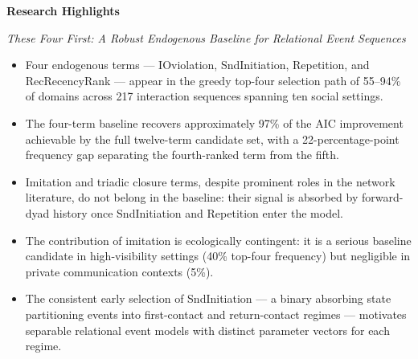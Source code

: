 \documentclass[11pt]{article}
\begin{document}
\noindent\textbf{Research Highlights}

\medskip
\noindent\textit{These Four First: A Robust Endogenous Baseline for Relational Event Sequences}

\bigskip
\begin{itemize}[leftmargin=1.5em, itemsep=0.5em]

  \item Four endogenous terms --- IOviolation, SndInitiation, Repetition, and
        RecRecencyRank --- appear in the greedy top-four selection path of 55--94\%
        of domains across 217 interaction sequences spanning ten social settings.

  \item The four-term baseline recovers approximately 97\% of the AIC improvement
        achievable by the full twelve-term candidate set, with a 22-percentage-point
        frequency gap separating the fourth-ranked term from the fifth.

  \item Imitation and triadic closure terms, despite prominent roles in the network
        literature, do not belong in the baseline: their signal is absorbed by
        forward-dyad history once SndInitiation and Repetition enter the model.

  \item The contribution of imitation is ecologically contingent: it is a serious
        baseline candidate in high-visibility settings (40\% top-four frequency)
        but negligible in private communication contexts (5\%).

  \item The consistent early selection of SndInitiation --- a binary absorbing state
        partitioning events into first-contact and return-contact regimes --- motivates
        separable relational event models with distinct parameter vectors for each regime.

\end{itemize}
\end{document}

